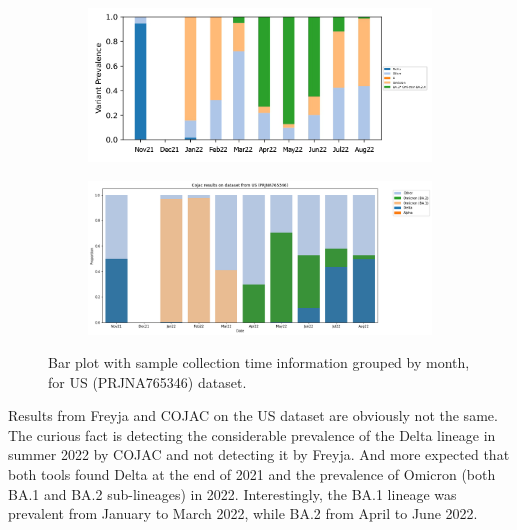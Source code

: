     \begin{figure}[ht!]
        \centering
        \begin{subfigure}[b]{1\textwidth}
        \includegraphics[width=1\textwidth]{figures/results/real/us-freyja-monthly.png}
        \label{fig:results:real:us-freyja-monthly}
        \end{subfigure}
        \hfill
        \begin{subfigure}[b]{0.9\textwidth}
        \includegraphics[width=1\textwidth]{figures/results/real/us-cojac-monthly.png}
        \label{fig:results:real:us-cojac-monthly}
        \end{subfigure}
        \hfill
        \caption{Bar plot with sample collection time information grouped by month, for US (PRJNA765346) dataset.}
    \end{figure}
    
    Results from Freyja and COJAC on the US dataset are obviously not the same. The curious fact is detecting the considerable prevalence of the Delta lineage in summer 2022 by COJAC and not detecting it by Freyja. And more expected that both tools found Delta at the end of 2021 and the prevalence of Omicron (both BA.1 and BA.2 sub-lineages) in 2022. Interestingly, the BA.1 lineage was prevalent from January to March 2022, while BA.2 from April to June 2022.
    
